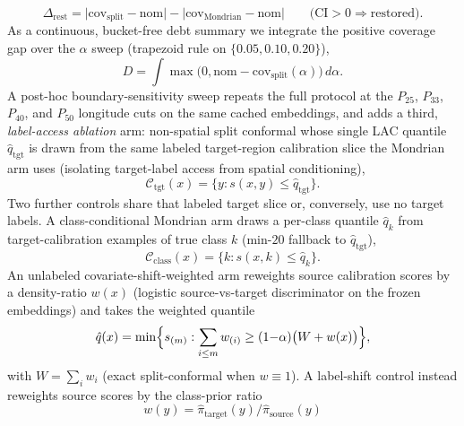 \documentclass[preprint,11pt,authoryear]{elsarticle}
\begin{document}
\begin{equation}
\label{eq:restoration}
\Delta_{\mathrm{rest}}
=\bigl|\mathrm{cov}_{\mathrm{split}}-\mathrm{nom}\bigr|
-\bigl|\mathrm{cov}_{\mathrm{Mondrian}}-\mathrm{nom}\bigr|
\qquad\bigl(\mathrm{CI}{>}0\Rightarrow\text{restored}\bigr).
\end{equation}
As a continuous, bucket-free debt summary we integrate the positive coverage gap over the $\alpha$ sweep
(trapezoid rule on $\{0.05,0.10,0.20\}$),
\begin{equation}
\label{eq:debt}
D=\int \max\bigl(0,\mathrm{nom}-\mathrm{cov}_{\mathrm{split}}(\alpha)\bigr)\,d\alpha.
\end{equation}
A post-hoc boundary-sensitivity sweep repeats the full protocol at the
$P_{25}$, $P_{33}$, $P_{40}$, and $P_{50}$ longitude
cuts on the same cached embeddings, and adds a third, \emph{label-access ablation} arm: non-spatial split
conformal whose single LAC quantile $\hat q_{\mathrm{tgt}}$ is drawn from the same labeled target-region
calibration slice the Mondrian arm uses (isolating target-label access from spatial conditioning),
\begin{equation}
\label{eq:target-cal}
\mathcal{C}_{\mathrm{tgt}}(x)
=\bigl\{y:s(x,y)\le\hat q_{\mathrm{tgt}}\bigr\}.
\end{equation}
Two further controls share that labeled target slice or, conversely, use no target labels.
A class-conditional Mondrian arm draws a per-class quantile $\hat q_k$ from target-calibration examples of
true class $k$ (min-$20$ fallback to $\hat q_{\mathrm{tgt}}$),
\begin{equation}
\label{eq:class-mondrian}
\mathcal{C}_{\mathrm{class}}(x)
=\bigl\{k:s(x,k)\le\hat q_k\bigr\}.
\end{equation}
An unlabeled covariate-shift-weighted arm \citep{tibshirani2019covariate} reweights source calibration
scores by a density-ratio $w(x)$ (logistic source-vs-target discriminator on the frozen embeddings) and
takes the weighted quantile
\begin{equation}
\label{eq:weighted-cp}
\hat q(x)
=\min\Bigl\{s_{(m)}:\sum_{i\le m}w_{(i)}\ge(1{-}\alpha)\bigl(W+w(x)\bigr)\Bigr\},
\end{equation}
with $W=\sum_i w_i$ (exact split-conformal when $w\equiv 1$). A label-shift control
\citep{podkopaev2021labelshift} instead reweights source scores by the class-prior ratio
\begin{equation}
\label{eq:labelshift-w}
w(y)=\hat\pi_{\mathrm{target}}(y)/\hat\pi_{\mathrm{source}}(y)
\end{equation}
\end{document}
